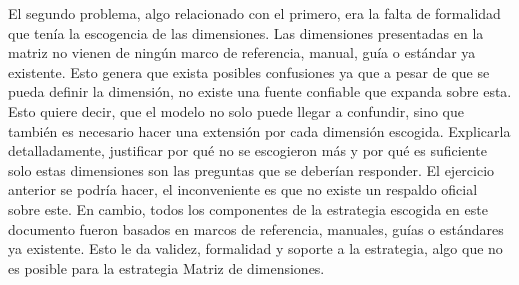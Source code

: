 El segundo problema, algo relacionado con el primero, era la falta de formalidad que tenía la escogencia de las dimensiones. Las dimensiones presentadas en la matriz no vienen de ningún marco de referencia, manual, guía o estándar ya existente. Esto genera que exista posibles confusiones ya que a pesar de que se pueda definir la dimensión, no existe una fuente confiable que expanda sobre esta. Esto quiere decir, que el modelo no solo puede llegar a confundir, sino que también es necesario hacer una extensión por cada dimensión escogida. Explicarla detalladamente, justificar por qué no se escogieron más y por qué es suficiente solo estas dimensiones son las preguntas que se deberían responder.  El ejercicio anterior se podría hacer, el inconveniente es que no existe un respaldo oficial sobre este. En cambio, todos los componentes de la estrategia escogida en este documento fueron basados en marcos de referencia, manuales, guías o estándares ya existente. Esto le da validez, formalidad y soporte a la estrategia, algo que no es posible para la estrategia Matriz de dimensiones.

